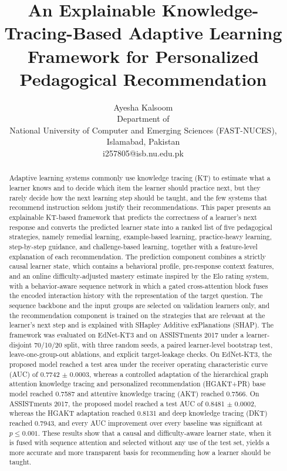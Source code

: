 \documentclass[11pt]{article}
\title{An Explainable Knowledge-Tracing-Based Adaptive Learning Framework for Personalized Pedagogical Recommendation}
\author{Ayesha Kalsoom\\
\small Department of \TBD\\ \small National University of Computer and Emerging Sciences (FAST-NUCES), Islamabad, Pakistan\\
\small i257805@isb.nu.edu.pk}
\date{}
\begin{document}
\maketitle

\begin{abstract}
Adaptive learning systems commonly use knowledge tracing (KT) to estimate what a learner knows and to decide which item the learner should practice next, but they rarely decide how the next learning step should be taught, and the few systems that recommend instruction seldom justify their recommendations. This paper presents an explainable KT-based framework that predicts the correctness of a learner's next response and converts the predicted learner state into a ranked list of five pedagogical strategies, namely remedial learning, example-based learning, practice-heavy learning, step-by-step guidance, and challenge-based learning, together with a feature-level explanation of each recommendation. The prediction component combines a strictly causal learner state, which contains a behavioral profile, pre-response context features, and an online difficulty-adjusted mastery estimate inspired by the Elo rating system, with a behavior-aware sequence network in which a gated cross-attention block fuses the encoded interaction history with the representation of the target question. The sequence backbone and the input groups are selected on validation learners only, and the recommendation component is trained on the strategies that are relevant at the learner's next step and is explained with SHapley Additive exPlanations (SHAP). The framework was evaluated on EdNet-KT3 and on ASSISTments 2017 under a learner-disjoint 70/10/20 split, with three random seeds, a paired learner-level bootstrap test, leave-one-group-out ablations, and explicit target-leakage checks. On EdNet-KT3, the proposed model reached a test area under the receiver operating characteristic curve (AUC) of 0.7742 $\pm$ 0.0003, whereas a controlled adaptation of the hierarchical graph attention knowledge tracing and personalized recommendation (HGAKT+PR) base model reached 0.7587 and attentive knowledge tracing (AKT) reached 0.7566. On ASSISTments 2017, the proposed model reached a test AUC of 0.8481 $\pm$ 0.0002, whereas the HGAKT adaptation reached 0.8131 and deep knowledge tracing (DKT) reached 0.7943, and every AUC improvement over every baseline was significant at $p \leq 0.001$. These results show that a causal and difficulty-aware learner state, when it is fused with sequence attention and selected without any use of the test set, yields a more accurate and more transparent basis for recommending how a learner should be taught.
\end{abstract}
\end{document}
